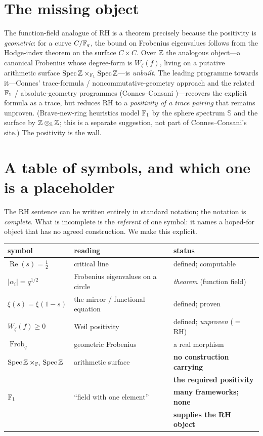 \documentclass[11pt]{article}
\begin{document}
\section{The missing object}
The function-field analogue of RH is a theorem precisely because the positivity is
\emph{geometric}: for a curve $C/\mathbb{F}_q$, the bound on Frobenius eigenvalues follows
from the Hodge-index theorem on the surface $C\times C$. Over $\mathbb{Z}$ the analogous
object---a canonical Frobenius whose degree-form is $W_\zeta(f)$, living on a putative
arithmetic surface $\operatorname{Spec}\mathbb{Z}\times_{\mathbb{F}_1}\operatorname{Spec}\mathbb{Z}$---is
\emph{unbuilt}. The leading programme towards it---Connes' trace-formula /
noncommutative-geometry approach and the related $\mathbb{F}_1$ / absolute-geometry
programmes (Connes--Consani \cite{ConnesConsani})---recovers the explicit formula as a
trace, but reduces RH to a \emph{positivity of a trace pairing} that remains unproven.
(Brave-new-ring heuristics model $\mathbb{F}_1$ by the sphere spectrum $\mathbb{S}$ and the
surface by $\mathbb{Z}\otimes_{\mathbb{S}}\mathbb{Z}$; this is a separate suggestion, not part of
Connes--Consani's site.) The positivity is the wall.

\section{A table of symbols, and which one is a placeholder}
The RH sentence can be written entirely in standard notation; the notation is
\emph{complete}. What is incomplete is the \emph{referent} of one symbol: it names a
hoped-for object that has no agreed construction. We make this explicit.

\begin{center}\small
\begin{tabular}{lll}
\hline
symbol & reading & status \\
\hline
$\operatorname{Re}(s)=\tfrac12$ & critical line & defined; computable \\
$|\alpha_i|=q^{1/2}$ & Frobenius eigenvalues on a circle & \emph{theorem} (function field) \\
$\xi(s)=\xi(1-s)$ & the mirror / functional equation & defined; proven \\
$W_\zeta(f)\ge 0$ & Weil positivity & defined; \emph{unproven} ($=$ RH) \\
$\operatorname{Frob}_q$ & geometric Frobenius & a real morphism \\
$\operatorname{Spec}\mathbb{Z}\times_{\mathbb{F}_1}\operatorname{Spec}\mathbb{Z}$ & arithmetic surface & \textbf{no construction carrying} \\
 & & \textbf{the required positivity} \\
$\mathbb{F}_1$ & ``field with one element'' & \textbf{many frameworks; none} \\
 & & \textbf{supplies the RH object} \\
\hline
\end{tabular}
\end{center}
\end{document}
